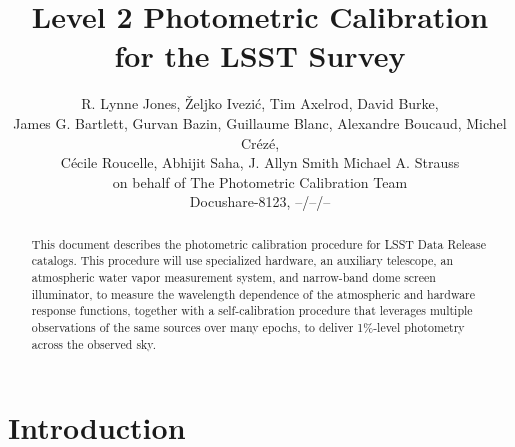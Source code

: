 \documentclass[12pt,preprint]{aastex}
\begin{document}
\title{Level 2 Photometric Calibration for the LSST Survey}

\author{
R. Lynne Jones, {\v Z}eljko Ivezi{\'c},  Tim Axelrod, David Burke, \\
James G. Bartlett, 
Gurvan Bazin,
Guillaume Blanc,
Alexandre Boucaud, 
Michel Cr{\'e}z{\'e}, \\ 
C{\'e}cile Roucelle, 
Abhijit Saha, 
J. Allyn Smith
Michael A. Strauss \\
on behalf of 
The Photometric Calibration Team \\ 
Docushare-8123, --/--/-- \\
}



\begin{abstract}
This document describes the photometric calibration procedure for LSST
Data Release catalogs. This procedure will use specialized hardware, 
an auxiliary telescope, an atmospheric water vapor measurement system, and narrow-band dome screen illuminator, to
measure the wavelength dependence of the atmospheric and hardware
response functions, together with a self-calibration procedure that
leverages multiple observations of the same sources over many epochs,
to deliver 1\%-level photometry across the observed sky.
\end{abstract}

\tableofcontents

\section{Introduction}
\end{document}
